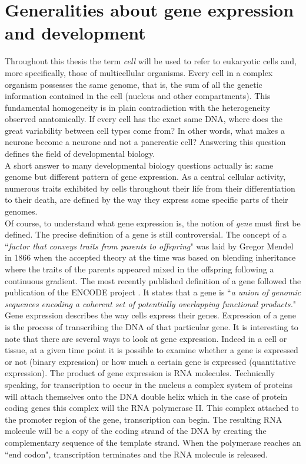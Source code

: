 \section{Generalities about gene expression and development}\label{sec:gene_expression_background}     
       
     Throughout this thesis the term \emph{cell} will be used to refer to eukaryotic cells and, more specifically, those of multicellular organisms. Every cell in a complex organism possesses the same genome, that is, the sum of all the genetic information contained in the cell (nucleus and other compartments). This fundamental homogeneity is in plain contradiction with the heterogeneity observed anatomically. If every cell has the exact same DNA, where does the great variability between cell types come from? In other words, what makes a neurone become a neurone and not a pancreatic cell? Answering this question defines the field of developmental biology.\\
     
     A short answer to many developmental biology questions actually is: same genome but different pattern of gene expression. As a central cellular activity, numerous traits exhibited by cells throughout their life from their differentiation to their death, are defined by the way they express some specific parts of their genomes.\\

     Of course, to understand what gene expression is, the notion of \emph{gene} must first be defined. The precise definition of a gene is still controversial. The concept of a ``\emph{factor that conveys traits from parents to offspring}" was laid by Gregor Mendel in 1866 \cite{mendel66} when the accepted theory at the time was based on blending inheritance where the traits of the parents appeared mixed in the offspring following a continuous gradient. The most recently published definition of a gene followed the publication of the ENCODE project \cite{feingold04}. It states that a gene is ``\emph{a union of genomic sequences encoding a coherent set of potentially overlapping functional products.}"\\

	Gene expression describes the way cells express their genes. Expression of a gene is the process of transcribing the DNA of that particular gene. It is interesting to note that there are several ways to look at gene expression. Indeed in a cell or tissue, at a given time point it is possible to examine whether a gene is expressed or not (binary expression) or how much a certain gene is expressed (quantitative expression). The product of gene expression is RNA molecules. Technically speaking, for transcription to occur in the nucleus a complex system of proteins will attach themselves onto the DNA double helix which in the case of protein coding genes this complex will the RNA polymerase II. This complex attached to the promoter region of the gene, transcription can begin. The resulting RNA molecule will be a copy of the coding strand of the DNA by creating the complementary sequence of the template strand. When the polymerase reaches an ``end codon", transcription terminates and the RNA molecule is released.\\
	
